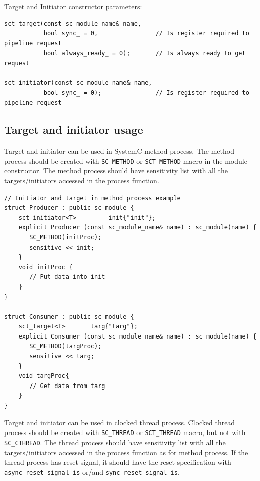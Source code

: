 Target and Initiator constructor parameters:
\begin{lstlisting}[style=mycpp]
sct_target(const sc_module_name& name, 
           bool sync_ = 0,                // Is register required to pipeline request 
           bool always_ready_ = 0);       // Is always ready to get request

sct_initiator(const sc_module_name& name,
           bool sync_ = 0);               // Is register required to pipeline request  
\end{lstlisting}

\subsection{Target and initiator usage}\label{section:sct_targ_init_usage}

Target and initiator can be used in SystemC method process. The method process should be created with {\tt SC\_METHOD} or {\tt SCT\_METHOD}  macro in the module constructor. The method process should have sensitivity list with all the targets/initiators accessed in the process function.

\begin{lstlisting}[style=mycpp]
// Initiator and target in method process example
struct Producer : public sc_module {
    sct_initiator<T>         init{"init"};
    explicit Producer (const sc_module_name& name) : sc_module(name) {
       SC_METHOD(initProc); 
       sensitive << init;
    } 
    void initProc {
       // Put data into init
    }
}

struct Consumer : public sc_module {
    sct_target<T>       targ{"targ"};   
    explicit Consumer (const sc_module_name& name) : sc_module(name) {
       SC_METHOD(targProc); 
       sensitive << targ;
    } 
    void targProc{
       // Get data from targ
    }
}
\end{lstlisting}

Target and initiator can be used in clocked thread process. Clocked thread process should be created with {\tt SC\_THREAD} or {\tt SCT\_THREAD} macro, but not with {\tt SC\_CTHREAD}. The thread process should have sensitivity list with all the targets/initiators accessed in the process function as for method process. If the thread process has reset signal, it should have the reset specification with {\tt async\_reset\_signal\_is} or/and {\tt sync\_reset\_signal\_is}.

